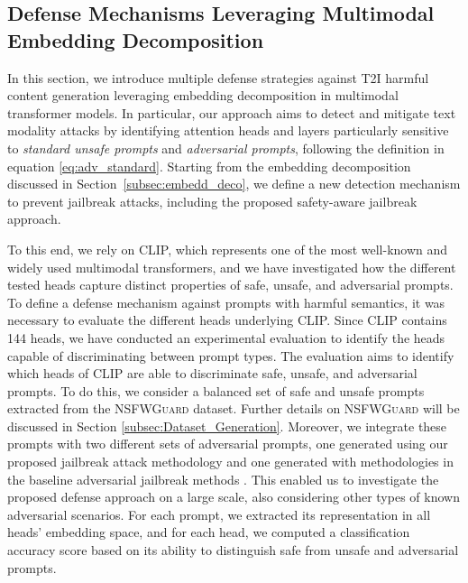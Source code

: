 \documentclass[acmsmall]{acmart}
\newcommand{\datacentok}{\textsc{NSFWGuard}\xspace}
\begin{document}
{\subsection{Defense Mechanisms Leveraging Multimodal Embedding Decomposition\label{subsec:proposed_defense_method}}
In this section, we introduce multiple defense strategies against T2I harmful content generation leveraging embedding decomposition in multimodal transformer models. In particular, our approach aims to detect and mitigate text modality attacks by identifying attention heads and layers particularly sensitive to \textit{standard unsafe prompts} and \textit{adversarial prompts}, following the definition in equation \ref{eq:adv_standard}. Starting from the embedding decomposition discussed in Section~\ref{subsec:embedd_deco}, we define a new detection mechanism to prevent jailbreak attacks, including the proposed safety-aware jailbreak approach.

To this end, we rely on CLIP, which represents one of the most well-known and widely used multimodal transformers, and we have investigated how the different tested heads capture distinct properties of safe, unsafe, and adversarial prompts. To define a defense mechanism against prompts with harmful semantics, it was necessary to evaluate the different heads underlying CLIP. Since CLIP contains 144 heads, we have conducted an experimental evaluation to identify the heads capable of discriminating between prompt types. The evaluation aims to identify which heads of CLIP are able to discriminate safe, unsafe, and adversarial prompts. To do this, we consider a balanced set of safe and unsafe prompts extracted from the \datacentok dataset. Further details on \datacentok will be discussed in Section \ref{subsec:Dataset_Generation}. Moreover, we integrate these prompts with two different sets of adversarial prompts, one generated using our proposed jailbreak attack methodology and one generated with methodologies in the baseline adversarial jailbreak methods \cite{yang2023sneakyprompt,chin2023prompting4debugging,yang2024mma, schramowski2023safe}. This enabled us to investigate the proposed defense approach on a large scale, also considering other types of known adversarial scenarios. For each prompt, we extracted its representation in all heads' embedding space, and for each head, we computed a classification accuracy score based on its ability to distinguish safe from unsafe and adversarial prompts.

}
\end{document}
